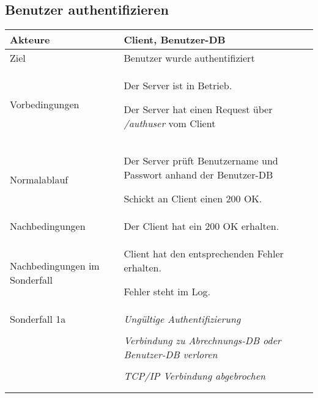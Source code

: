 \documentclass[a4paper,10pt,titlepage,parskip=true]{article}
\makeatletter
\newcommand\novspace{\@minipagetrue}
\newenvironment{owncompactitem}{%
\compactitem
}{%
\@finalstrut\@arstrutbox
\@nameuse{endcompactitem}%
\aftergroup\let\aftergroup\@finalstrut\aftergroup\@gobble
}
\newenvironment{owncompactenum}{%
\compactenum
}{%
\@finalstrut\@arstrutbox
\@nameuse{endcompactenum}%
\aftergroup\let\aftergroup\@finalstrut\aftergroup\@gobble
}
\newcommand{\usecase}[7]
{\subsection{#1}
\setlength{\extrarowheight}{2pt}
\begin{tabular}{|p{0.2\textwidth}|p{0.9\textwidth}|}
\hline
  Akteure & #2\\\hline
  Ziel & #3\\\hline
  Vorbedingungen & \novspace
  	\begin{owncompactitem}[-] #4 \end{owncompactitem} \\\hline
  Normalablauf & \vspace{-7pt}
  	\begin{owncompactenum}[1.] #6 \end{owncompactenum} \\\hline
  Nachbedingungen & \novspace
  	\begin{owncompactitem}[-] #5 \end{owncompactitem} \\\hline
  #7
\end{tabular}
}
\newcommand{\sonderfall}[4][\empty]
{
Sonderfall #2 & \vspace{-10pt}
	\textit{#3}
	\begin{owncompactenum}[{#2}.1] {#4} \end{owncompactenum}
  	\ifthenelse{\equal{#1}{\empty}}
    	{\\\hline} %
    	{\ensuremath{\rightarrow} #1 \\ [+1pt] \hline} %

}
\newcommand{\sondernachbedingung}[1]
{
Nachbedingungen im Sonderfall& \novspace
	\begin{owncompactitem}[-]
		#1
	\end{owncompactitem} \\\hline
}
\makeatother
\begin{document}
\usecase{Benutzer authentifizieren}{Client, Benutzer-DB}%
{Benutzer wurde authentifiziert}%
{%
  \item Der Server ist in Betrieb.
  \item Der Server hat einen Request über \textit{/authuser} vom Client
}
{%
  \item Der Client hat ein 200 OK erhalten.
}
{%
  \item Der Server prüft Benutzername und Passwort anhand der Benutzer-DB
  \item Schickt an Client einen 200 OK.
}
{%
  \sondernachbedingung{
	\item Client hat den entsprechenden Fehler erhalten.
	\item Fehler steht im Log.
	}
	\sonderfall[Weiter mit normalem Betrieb]{1a}
    {Ungültige Authentifizierung}
    {
    \item Fehler wird ins Log geschrieben
  	\item Der Client erhält einen EAUTH Fehler mit HTTP-Status 401 Unauthorized
    }
	
  
	 \sonderfall[Der Server nimmt keine weiteren Anfragen an bis Verbindung zur Datenbank wieder hergestellt.]{*}%
	{Verbindung zu Abrechnungs-DB oder Benutzer-DB verloren}%
  	{
	\item Der Fehler wird ins Log geschrieben
	\item Der Client erhält einen EDATABASE Fehler mit HTTP-Status 503 Service Unavailable
  	}

\sonderfall[Weiter mit normalem Betrieb]{**}%
	{TCP/IP Verbindung abgebrochen}%
	{
	\item Fehlermeldung wird ins Log geschrieben
	}
}
\end{document}
